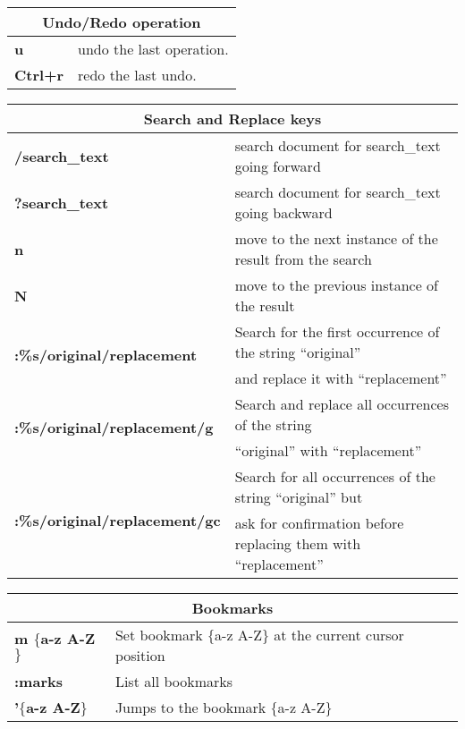 \begin{table}[h]
\centering
\footnotesize
\begin{tabular}{|l|l|}
\multicolumn{2}{c}{\textbf{Undo/Redo operation}}\\
\hline
\textbf{u}	& {undo the last operation.}\\
\hline
\textbf{Ctrl+r}	& {redo the last undo.}\\
\hline
\end{tabular}
\end{table}


\begin{table}[h]
\centering
\footnotesize
\begin{tabular}{|l|l|}
\multicolumn{2}{c}{\textbf{Search and Replace keys}}\\
\hline
\textbf{/search\_text}	& {search document for search\_text going forward}\\
\hline
\textbf{?search\_text}	& {search document for search\_text going backward}\\
\hline
\textbf{n} & {move to the next instance of the result from the search}\\
\hline
\textbf{N} & {move to the previous instance of the result}\\
\hline
\multirow{2}{*}{\textbf{:\%s/original/replacement}} & {Search for the first occurrence of the string “original”}\\
& {and replace it with “replacement”}\\
\hline
\multirow{2}{*}{\textbf{:\%s/original/replacement/g}} & {Search and replace all occurrences of the string}\\
& {“original” with “replacement”}\\
\hline
\multirow{2}{*}{\textbf{:\%s/original/replacement/gc}} & {Search for all occurrences of the string “original” but}\\
& {ask for confirmation before replacing them with “replacement”}\\
\hline
\end{tabular}
\end{table}

\begin{table}[h]
\centering
\footnotesize
\begin{tabular}{|l|l|}
\multicolumn{2}{c}{\textbf{Bookmarks}}\\
\hline
\textbf{m $\lbrace$a-z A-Z$\rbrace$} &	{Set bookmark $\lbrace$a-z A-Z$\rbrace$ at the current cursor position}\\
\hline
\textbf{:marks} & {List all bookmarks}\\
\hline
\textbf{'$\lbrace$a-z A-Z$\rbrace$}	 & {Jumps to the bookmark $\lbrace$a-z A-Z$\rbrace$}\\
\hline
\end{tabular}
\end{table}

